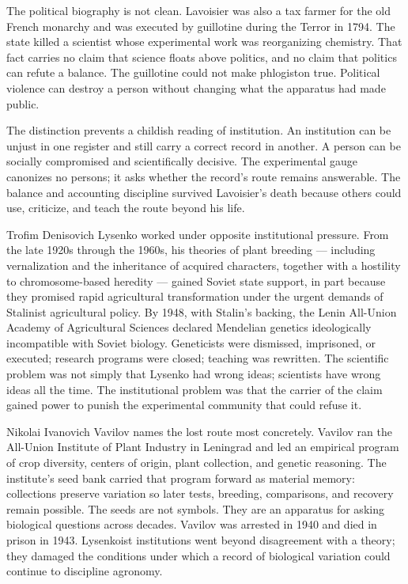 The political biography is not clean. Lavoisier was also a tax farmer
for the old French monarchy and was executed by guillotine during the
Terror in 1794. The state killed a scientist whose
experimental work was reorganizing chemistry. That fact carries no claim
that science floats above politics, and no claim that politics can refute
a balance. The guillotine could not make phlogiston true. Political
violence can destroy a person without changing what the apparatus had
made public.

The distinction prevents a childish reading of institution. An
institution can be unjust in one register and still carry a correct
record in another. A person can be socially compromised and
scientifically decisive. The experimental gauge canonizes no persons; it
asks whether the record's route remains answerable. The balance and
accounting discipline survived Lavoisier's death because others could
use, criticize, and teach the route beyond his life.

Trofim Denisovich Lysenko worked under opposite institutional pressure.
From the late 1920s through the 1960s, his theories of plant breeding
--- including vernalization and the inheritance of acquired characters,
together with a hostility to chromosome-based heredity --- gained Soviet
state support, in part because they promised rapid agricultural
transformation under the urgent demands of Stalinist agricultural
policy. By 1948, with Stalin's backing, the Lenin All-Union Academy of
Agricultural Sciences declared Mendelian genetics ideologically
incompatible with Soviet biology. Geneticists were dismissed, imprisoned,
or executed; research programs were closed; teaching was rewritten. The
scientific problem was not simply that Lysenko had wrong ideas;
scientists have wrong ideas all the time. The institutional problem was
that the carrier of the claim gained power to punish the experimental
community that could refuse it.

Nikolai Ivanovich Vavilov names the lost route most concretely. Vavilov
ran the All-Union Institute of Plant Industry in Leningrad and led an
empirical program of crop diversity, centers of origin, plant collection,
and genetic reasoning. The institute's seed bank carried that program
forward as material memory: collections preserve variation so later
tests, breeding, comparisons, and recovery remain possible. The seeds
are not symbols. They are an apparatus for asking biological questions
across decades. Vavilov was arrested in 1940 and died in prison in 1943.
Lysenkoist institutions went beyond disagreement with a theory; they
damaged the conditions under which a record of biological variation could
continue to discipline agronomy.

